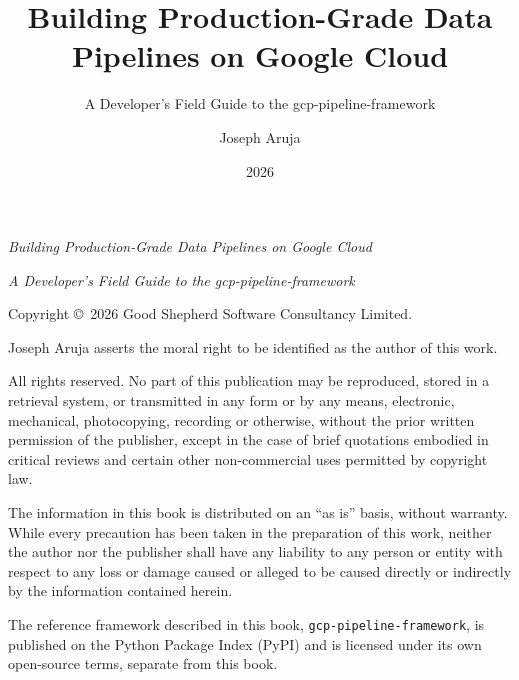 \documentclass[
  11pt,
  british,
  oneside]{book}
\title{Building Production-Grade Data Pipelines on Google Cloud}
\subtitle{A Developer's Field Guide to the gcp-pipeline-framework}
\author{Joseph Aruja}
\date{2026}
\begin{document}
\frontmatter
\maketitle

{
\hypersetup{linkcolor=black}
\setcounter{tocdepth}{2}
\tableofcontents
}
\mainmatter
\newpage

\thispagestyle{empty}

\vspace*{2cm}

\begin{center}
\textit{Building Production-Grade Data Pipelines on Google Cloud}

\textit{A Developer's Field Guide to the gcp-pipeline-framework}
\end{center}

\vspace{1cm}

\noindent Copyright \copyright~2026 Good Shepherd Software Consultancy
Limited.

\noindent Joseph Aruja asserts the moral right to be identified as the
author of this work.

\vspace{0.5cm}

\noindent All rights reserved. No part of this publication may be
reproduced, stored in a retrieval system, or transmitted in any form or
by any means, electronic, mechanical, photocopying, recording or
otherwise, without the prior written permission of the publisher, except
in the case of brief quotations embodied in critical reviews and certain
other non-commercial uses permitted by copyright law.

\vspace{0.5cm}

\noindent The information in this book is distributed on an ``as is''
basis, without warranty. While every precaution has been taken in the
preparation of this work, neither the author nor the publisher shall
have any liability to any person or entity with respect to any loss or
damage caused or alleged to be caused directly or indirectly by the
information contained herein.

\vspace{0.5cm}

\noindent The reference framework described in this book,
\texttt{gcp-pipeline-framework}, is published on the Python Package
Index (PyPI) and is licensed under its own open-source terms, separate
from this book.

\vspace{1cm}
\end{document}
